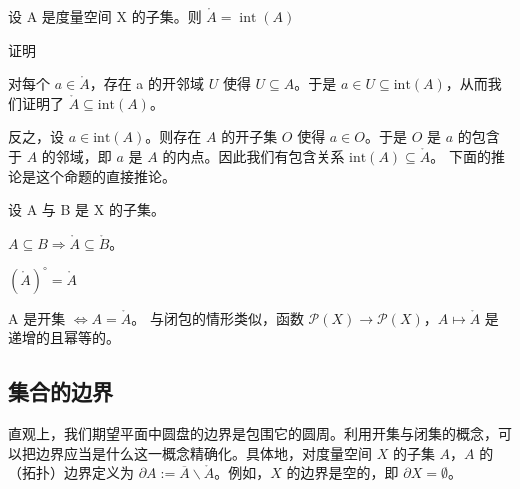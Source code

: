 \begin{proposition}

设 A 是度量空间 X 的子集。则 $ \mathring{A} = \operatorname{int}(A) $

证明

\begin{subitems}
\item

对每个 $ a \in \mathring{A} $，存在 a 的开邻域 $ U $ 使得 $ U \subseteq A $。于是 $ a \in U \subseteq \mathrm{int}(A) $，从而我们证明了 $ \mathring{A} \subseteq \mathrm{int}(A) $。

\item

反之，设 $a \in \mathrm{int}(A)$。则存在 $A$ 的开子集 $O$ 使得 $a \in O$。于是 $O$ 是 $a$ 的包含于 $A$ 的邻域，即 $a$ 是 $A$ 的内点。因此我们有包含关系 $\mathrm{int}(A) \subseteq \mathring{A}$。
下面的推论是这个命题的直接推论。

\end{subitems}

\end{proposition}

\begin{corollary}

设 A 与 B 是 X 的子集。

\begin{subitems}
\item

$ A \subseteq B \Rightarrow \mathring{A} \subseteq \mathring{B} $。

\item

$ (\mathring{A})^{\circ} = \mathring{A} $

\item

A 是开集 $ \Leftrightarrow A = \mathring{A} $。
与闭包的情形类似，函数 $ \mathcal{P}(X) \to \mathcal{P}(X) $，$ A \mapsto \mathring{A} $ 是递增的且幂等的。

\end{subitems}

\end{corollary}

\subsection*{集合的边界}

直观上，我们期望平面中圆盘的边界是包围它的圆周。利用开集与闭集的概念，可以把边界应当是什么这一概念精确化。具体地，对度量空间 $X$ 的子集 $A$，$A$ 的（拓扑）边界定义为 $\partial A := \overline{A} \backslash \mathring{A}$。例如，$X$ 的边界是空的，即 $\partial X = \emptyset$。

